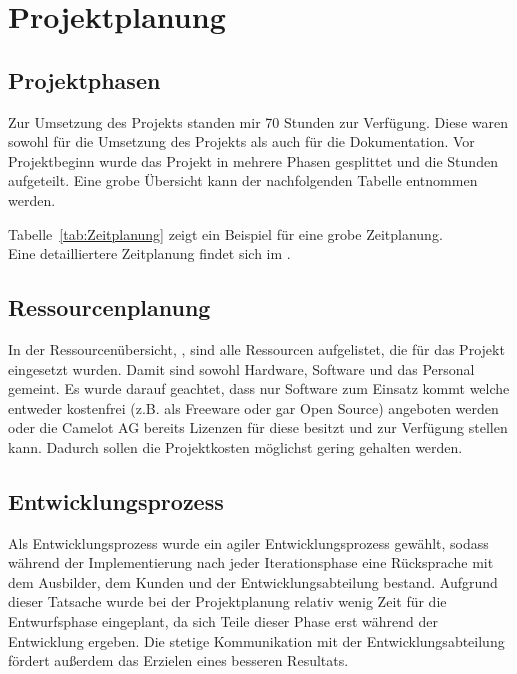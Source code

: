 \section{Projektplanung} 
\label{sec:Projektplanung}

\subsection{Projektphasen}
\label{sec:Projektphasen}
Zur Umsetzung des Projekts standen mir 70 Stunden zur Verfügung. Diese waren sowohl für die Umsetzung des Projekts als auch für die Dokumentation. Vor Projektbeginn wurde das Projekt in mehrere Phasen gesplittet und die Stunden aufgeteilt. Eine grobe Übersicht kann der nachfolgenden Tabelle entnommen werden. 

Tabelle~\ref{tab:Zeitplanung} zeigt ein Beispiel für eine grobe Zeitplanung.
\\
Eine detailliertere Zeitplanung findet sich im .

\subsection{Ressourcenplanung}
\label{sec:Ressourcenplanung}
In der Ressourcenübersicht, , sind alle Ressourcen aufgelistet, die für das Projekt eingesetzt wurden. Damit sind sowohl Hardware, Software und das Personal gemeint. Es wurde darauf geachtet, dass nur Software zum Einsatz kommt welche entweder kostenfrei (z.B. als Freeware oder gar Open Source) angeboten werden oder die Camelot AG bereits Lizenzen für diese besitzt und zur Verfügung stellen kann. Dadurch sollen die Projektkosten möglichst gering gehalten werden. 

\subsection{Entwicklungsprozess}
\label{sec:Entwicklungsprozess}
Als Entwicklungsprozess wurde ein agiler Entwicklungsprozess gewählt, sodass während der Implementierung nach jeder Iterationsphase eine Rücksprache mit dem Ausbilder, dem Kunden und der Entwicklungsabteilung bestand. Aufgrund dieser Tatsache wurde bei der Projektplanung relativ wenig Zeit für die Entwurfsphase eingeplant, da sich Teile dieser Phase erst während der Entwicklung ergeben. Die stetige Kommunikation mit der Entwicklungsabteilung fördert außerdem das Erzielen eines besseren Resultats.
